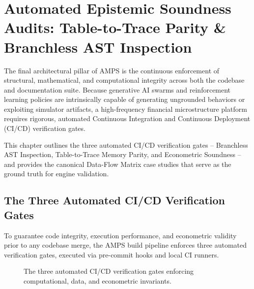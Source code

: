 \chapter{Automated Epistemic Soundness Audits: Table-to-Trace Parity \& Branchless AST Inspection}
\label{ch:epistemic_soundness}

The final architectural pillar of AMPS is the continuous enforcement of structural, mathematical, and computational integrity across both the codebase and documentation suite. Because generative AI swarms and reinforcement learning policies are intrinsically capable of generating ungrounded behaviors or exploiting simulator artifacts, a high-frequency financial microstructure platform requires rigorous, automated Continuous Integration and Continuous Deployment (CI/CD) verification gates. 

This chapter outlines the three automated CI/CD verification gates -- Branchless AST Inspection, Table-to-Trace Memory Parity, and Econometric Soundness -- and provides the canonical Data-Flow Matrix case studies that serve as the ground truth for engine validation.

\section{The Three Automated CI/CD Verification Gates}

To guarantee code integrity, execution performance, and econometric validity prior to any codebase merge, the AMPS build pipeline enforces three automated verification gates, executed via pre-commit hooks and local CI runners.

\begin{figure}[htbp]
\centering
{}
\caption{The three automated CI/CD verification gates enforcing computational, data, and econometric invariants.}
\label{fig:three_ci_gates}
\end{figure}

